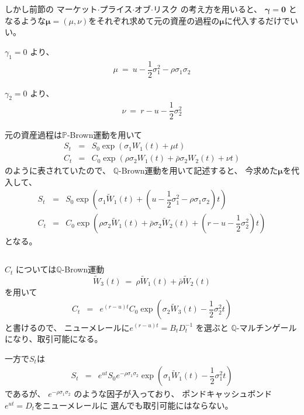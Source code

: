 \documentclass[uplatex,a4j,12pt,dvipdfmx]{jsarticle}
\begin{document}
しかし前節の
マーケット$\cdot$プライス$\cdot$オブ$\cdot$リスク
の考え方を用いると、
${\bm \gamma} = {\bm 0}$
となるような${\bm \mu} = (\mu,\nu)$をそれぞれ求めて元の資産の過程の${\bm \mu}$に代入するだけでいい。

$\gamma_{1} = 0$
より、
%
%
\begin{eqnarray}
	\mu
	\ = \
	u - \dfrac{1}{2} \sigma_{1}^{2} - \rho \sigma_{1} \sigma_{2}
\end{eqnarray}
%
%

$\gamma_{2} = 0$
より、
%
%
\begin{eqnarray}
	\nu
	\ = \
	r - u - \dfrac{1}{2} \sigma_{2}^{2}
\end{eqnarray}
%
%

元の資産過程は$\mathbb{P}$-Brown運動を用いて
%
%
\begin{eqnarray}
	S_{t}
	&=&
	S_{0}
	\exp \left( \sigma_{1} W_{1}(t) + \mu t \right)
	\\
	C_{t}
	&=&
	C_{0}
	\exp \left(
	\rho \sigma_{2} W_{1}(t) +
	\bar{\rho} \sigma_{2} W_{2}(t) + \nu t \right)
\end{eqnarray}
%
%
のように表されていたので、
$\mathbb{Q}$-Brown運動を用いて記述すると、
今求めた${\bm \mu}$を代入して、
%
%
\begin{eqnarray}
	S_{t}
	&=&
	S_{0}
	\exp \left( \sigma_{1} \tilde{W}_{1}(t) +
	\left(
		u - \dfrac{1}{2} \sigma_{1}^{2} - \rho \sigma_{1} \sigma_{2}
		\right)
	t \right)
	\\
	C_{t}
	&=&
	C_{0}
	\exp \left(
	\rho \sigma_{2} \tilde{W}_{1}(t) +
	\bar{\rho} \sigma_{2} \tilde{W}_{2}(t) +
	\left(
		r - u - \dfrac{1}{2} \sigma_{2}^{2}
		\right)
	t \right)
\end{eqnarray}
%
%
となる。

${}$

$C_{t}$
については$\mathbb{Q}$-Brown運動
$$
	\tilde{W}_{3}(t)
	\ = \
	\rho \tilde{W}_{1}(t) +
	\bar{\rho} \tilde{W}_{2}(t)
$$
を用いて
%
%
\begin{eqnarray}
	C_{t}
	&=&
	e^{(r-u)t}
	C_{0}
	\exp \left(
	\sigma_{2} \tilde{W}_{3}(t) -
	\dfrac{1}{2} \sigma_{2}^{2}
	t \right)
\end{eqnarray}
%
%
と書けるので、
ニューメレールに$e^{(r-u)t} = B_{t} D^{-1}_{t}$
を選ぶと
$\mathbb{Q}$-マルチンゲールになり、取引可能になる。

一方で$S_{t}$は
%
%
\begin{eqnarray}
	S_{t}
	&=&
	e^{ut}
	S_{0}
	e^{- \rho \sigma_{1} \sigma_{2}}
	\exp \left( \sigma_{1} \tilde{W}_{1}(t) -
	\dfrac{1}{2} \sigma_{1}^{2}
	t \right)
\end{eqnarray}
%
%
であるが、
$e^{- \rho \sigma_{1} \sigma_{2}}$
のような因子が入っており、
ポンドキャッシュボンド$e^{ut} = D_{t}$をニューメレールに
選んでも取引可能にはならない。
\end{document}
